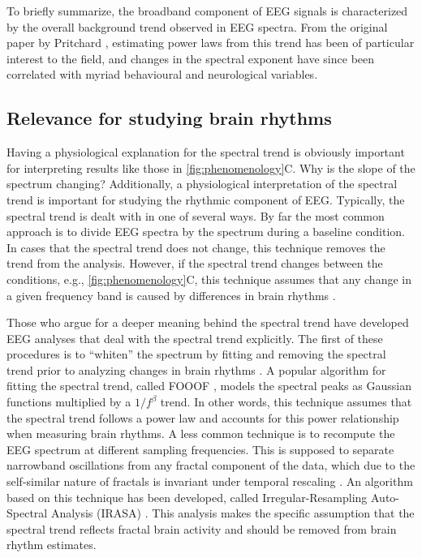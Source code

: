 To briefly summarize, the broadband component of EEG signals is characterized by the overall background trend observed in EEG spectra. From the original paper by Pritchard \cite{Pritchard1992}, estimating power laws from this trend has been of particular interest to the field, and changes in the spectral exponent have since been correlated with myriad behavioural and neurological variables.

\subsection{Relevance for studying brain rhythms} \label{sec:detrending}
Having a physiological explanation for the spectral trend is obviously important for interpreting results like those in \autoref{fig:phenomenology}C. Why is the slope of the spectrum changing? Additionally, a physiological interpretation of the spectral trend is important for studying the rhythmic component of EEG. Typically, the spectral trend is dealt with in one of several ways. By far the most common approach is to divide EEG spectra by the spectrum during a baseline condition. In cases that the spectral trend does not change, this technique removes the trend from the analysis. However, if the spectral trend changes between the conditions, e.g., \autoref{fig:phenomenology}C, this technique assumes that any change in a given frequency band is caused by differences in brain rhythms \cite{Gerster2022}.

Those who argue for a deeper meaning behind the spectral trend have developed EEG analyses that deal with the spectral trend explicitly. The first of these procedures is to ``whiten'' the spectrum by fitting and removing the spectral trend prior to analyzing changes in brain rhythms \cite{Buzsaki2004,Buzsaki2006,Donoghue2020}. A popular algorithm for fitting the spectral trend, called FOOOF \cite{Donoghue2020}, models the spectral peaks as Gaussian functions multiplied by a $1/f^\beta$ trend. In other words, this technique assumes that the spectral trend follows a power law and accounts for this power relationship when measuring brain rhythms. A less common technique is to recompute the EEG spectrum at different sampling frequencies. This is supposed to separate narrowband oscillations from any fractal component of the data, which due to the self-similar nature of fractals is invariant under temporal rescaling \cite{Yamamoto1993}. An algorithm based on this technique has been developed, called Irregular-Resampling Auto-Spectral Analysis (IRASA) \cite{Wen2016}. This analysis makes the specific assumption that the spectral trend reflects fractal brain activity and should be removed from brain rhythm estimates.

